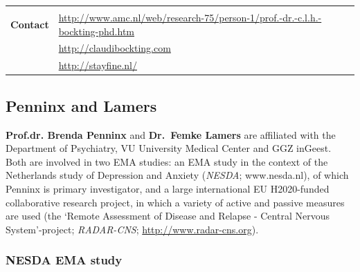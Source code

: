 \documentclass[]{book}
\begin{document}
\begin{longtable}[]{@{}ll@{}}
\begin{minipage}[t]{0.69\columnwidth}
\end{minipage}\tabularnewline
\begin{minipage}[t]{0.25\columnwidth}\raggedright\strut
\textbf{Contact}\strut
\end{minipage} & \begin{minipage}[t]{0.69\columnwidth}\raggedright\strut
\url{http://www.amc.nl/web/research-75/person-1/prof.-dr.-c.l.h.-bockting-phd.htm}\strut
\end{minipage}\tabularnewline
\begin{minipage}[t]{0.25\columnwidth}\raggedright\strut
\strut
\end{minipage} & \begin{minipage}[t]{0.69\columnwidth}\raggedright\strut
\url{http://claudibockting.com}\strut
\end{minipage}\tabularnewline
\begin{minipage}[t]{0.25\columnwidth}\raggedright\strut
\strut
\end{minipage} & \begin{minipage}[t]{0.69\columnwidth}\raggedright\strut
\url{http://stayfine.nl/}\strut
\end{minipage}\tabularnewline
\bottomrule
\end{longtable}

\subsection{Penninx and Lamers}\label{penninx-and-lamers}

 

\textbf{Prof.dr. Brenda Penninx} and \textbf{Dr.~Femke Lamers} are
affiliated with the Department of Psychiatry, VU University Medical
Center and GGZ inGeest. Both are involved in two EMA studies: an EMA
study in the context of the Netherlands study of Depression and Anxiety
(\emph{NESDA}; www.nesda.nl), of which Penninx is primary investigator,
and a large international EU H2020-funded collaborative research
project, in which a variety of active and passive measures are used (the
`Remote Assessment of Disease and Relapse - Central Nervous
System'-project; \emph{RADAR-CNS}; \url{http://www.radar-cns.org}).

\subsubsection{NESDA EMA study}\label{nesda-ema-study}

 
\end{document}
